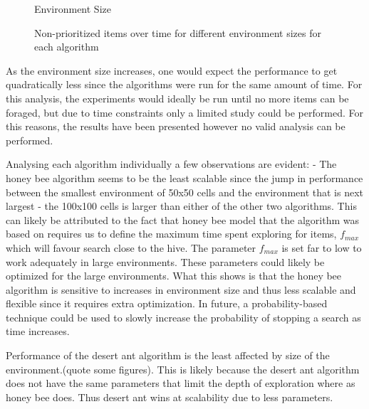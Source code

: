 


\begin{figure}[!htb]
\centering
\resizebox{\textwidth}{!}{}
\caption{Environment Size}
\label{sizegoldplot}
\end{figure}

\begin{figure}[!htb]
\centering
\resizebox{\textwidth}{!}{}
\caption{Non-prioritized items over time for different environment sizes for each algorithm}
\label{sizewasteplot}
\end{figure}

As the environment size increases, one would expect the performance to get quadratically less since the algorithms were run for the same amount of time. For this analysis, the experiments would ideally be run until no more items can be foraged, but due to time constraints only a limited study could be performed. For this reasons, the results have been presented however no valid analysis can be performed.


Analysing each algorithm individually a few observations are evident:
- The honey bee algorithm seems to be the least scalable since the jump in performance between the smallest environment of 50x50 cells and the environment that is next largest - the 100x100 cells is larger than either of the other two algorithms. This can likely be attributed to the fact that honey bee model that the algorithm was based on requires us to define the maximum time spent exploring for items, $f_{max}$ which will favour search close to the hive. The parameter $f_{max}$ is set far to low to work adequately in large environments. These parameters could likely be optimized for the large environments. What this shows is that the honey bee algorithm is sensitive to increases in environment size and thus less scalable and flexible since it requires extra optimization. In future, a probability-based technique could be used to slowly increase the probability of stopping a search as time increases. 

Performance of the desert ant algorithm is the least affected by size of the environment.(quote some figures). This is likely because the desert ant algorithm does not have the same parameters that limit the depth of exploration where as honey bee does. Thus desert ant wins at scalability due to less parameters. 


